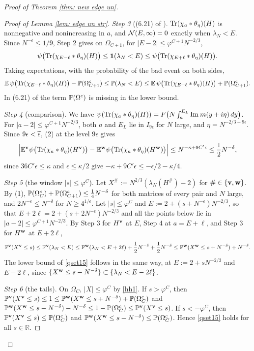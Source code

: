 \begin{proof}[Proof of Theorem \ref{thm: new edge un}]
\begin{proof}[Proof of Lemma \ref{lem: edge un str}]
{\it Step 3} ((6.21) of \cite{EYY}). ${\rm Tr}(\chi_a*\theta_\eta)(H)$ is nonnegative and nonincreasing in $a$, and $\mathcal{N}(E,\infty)=0$ exactly when $\lambda_N<E$. Since $N^{-\epsilon}\le1/9$, Step 2 gives on $\Omega_{C+1}$, for $|E-2|\le\varphi^{C+1}N^{-2/3}$,
$$
\psi\big({\rm Tr}(\chi_{E-\ell}*\theta_\eta)(H)\big)\le{\bf 1}(\lambda_N<E)\le\psi\big({\rm Tr}(\chi_{E+\ell}*\theta_\eta)(H)\big).
$$
Taking expectations, with the probability of the bad event on both sides,
$$
\mathbb{E}\,\psi\big({\rm Tr}(\chi_{E-\ell}*\theta_\eta)(H)\big)-\mathbb{P}(\Omega_{C+1}^c)\le\mathbb{P}(\lambda_N<E)\le\mathbb{E}\,\psi\big({\rm Tr}(\chi_{E+\ell}*\theta_\eta)(H)\big)+\mathbb{P}(\Omega_{C+1}^c).
$$
In (6.21) of \cite{EYY} the term $\mathbb{P}(\Omega^c)$ is missing in the lower bound.

{\it Step 4} (comparison). We have $\psi({\rm Tr}(\chi_a*\theta_\eta)(H))=F\big(N\int_a^{E_L}\mathrm{Im}\: m(y+i\eta)\,dy\big)$. For $|a-2|\le\varphi^{C+1}N^{-2/3}$, both $a$ and $E_L$ lie in $I_{9\epsilon}$ for $N$ large, and $\eta=N^{-2/3-9\epsilon}$. Since $9\epsilon<\widetilde\epsilon$, (2) at the level $9\epsilon$ gives
$$
\Big|\mathbb{E}^{\mathbf{v}}\psi\big({\rm Tr}(\chi_a*\theta_\eta)(H^{\mathbf{v}})\big)-\mathbb{E}^{\mathbf{w}}\psi\big({\rm Tr}(\chi_a*\theta_\eta)(H^{\mathbf{w}})\big)\Big|\le N^{-\kappa+9C'\epsilon}\le\frac12N^{-\delta},
$$
since $36C'\epsilon\le\kappa$ and $\epsilon\le\kappa/2$ give $-\kappa+9C'\epsilon\le-\epsilon/2-\kappa/4$.

{\it Step 5} (the window $|s|\le\varphi^C$). Let $X^{\#}:=N^{2/3}(\lambda_N(H^{\#})-2)$ for $\#\in\{\mathbf{v},\mathbf{w}\}$. By (1), $\mathbb{P}(\Omega_C^c)+\mathbb{P}(\Omega_{C+1}^c)\le\frac14N^{-\delta}$ for both matrices of every pair and $N$ large, and $2N^{-\epsilon}\le N^{-\delta}$ for $N\ge4^{1/\epsilon}$. Let $|s|\le\varphi^C$ and $E:=2+(s+N^{-\epsilon})N^{-2/3}$, so that $E+2\ell=2+(s+2N^{-\epsilon})N^{-2/3}$ and all the points below lie in $|a-2|\le\varphi^{C+1}N^{-2/3}$. By Step 3 for $H^{\mathbf{v}}$ at $E$, Step 4 at $a=E+\ell$, and Step 3 for $H^{\mathbf{w}}$ at $E+2\ell$,
$$
\mathbb{P}^{\mathbf{v}}(X^{\mathbf{v}}\le s)\le\mathbb{P}^{\mathbf{v}}(\lambda_N<E)\le\mathbb{P}^{\mathbf{w}}(\lambda_N<E+2\ell)+\frac12N^{-\delta}+\frac12N^{-\delta}\le\mathbb{P}^{\mathbf{w}}(X^{\mathbf{w}}\le s+N^{-\delta})+N^{-\delta}.
$$
The lower bound of \eqref{qset15} follows in the same way, at $E:=2+sN^{-2/3}$ and $E-2\ell$, since $\{X^{\mathbf{w}}\le s-N^{-\delta}\}\subset\{\lambda_N<E-2\ell\}$.

{\it Step 6} (the tails). On $\Omega_C$, $|X|\le\varphi^C$ by \eqref{hh1}. If $s>\varphi^C$, then $\mathbb{P}^{\mathbf{v}}(X^{\mathbf{v}}\le s)\le1\le\mathbb{P}^{\mathbf{w}}(X^{\mathbf{w}}\le s+N^{-\delta})+\mathbb{P}(\Omega_C^c)$ and $\mathbb{P}^{\mathbf{w}}(X^{\mathbf{w}}\le s-N^{-\delta})-N^{-\delta}\le1-\mathbb{P}(\Omega_C^c)\le\mathbb{P}^{\mathbf{v}}(X^{\mathbf{v}}\le s)$. If $s<-\varphi^C$, then $\mathbb{P}^{\mathbf{v}}(X^{\mathbf{v}}\le s)\le\mathbb{P}(\Omega_C^c)$ and $\mathbb{P}^{\mathbf{w}}(X^{\mathbf{w}}\le s-N^{-\delta})\le\mathbb{P}(\Omega_C^c)$. Hence \eqref{qset15} holds for all $s\in\mathbb R$.
\end{proof}


\end{proof}
